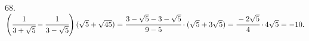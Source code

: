 68. $\left(\cfrac{1}{3+\sqrt{5}}-\cfrac{1}{3-\sqrt{5}}\right)(\sqrt{5}+\sqrt{45})=\cfrac{3-\sqrt{5}-3-\sqrt{5}}{9-5}\cdot(\sqrt{5}+3\sqrt{5})=
\cfrac{-2\sqrt{5}}{4}\cdot4\sqrt{5}=-10.$\\
